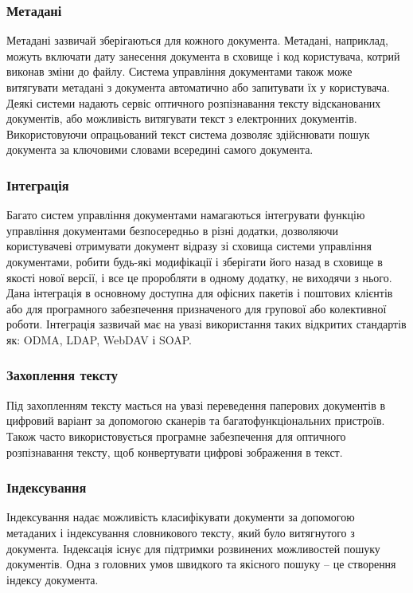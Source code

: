 \subsubsection{Метадані}
Метадані зазвичай зберігаються для кожного документа. 
Метадані, наприклад, можуть включати дату занесення документа в сховище і код користувача, котрий виконав зміни до файлу. 
Система управління документами також може витягувати метадані з документа автоматично або запитувати їх у користувача. 
Деякі системи надають сервіс оптичного розпізнавання тексту відсканованих документів, або можливість витягувати текст з електронних документів. 
Використовуючи опрацьований текст система дозволяє здійснювати пошук документа за ключовими словами всередині самого документа.

\subsubsection{Інтеграція }
Багато систем управління документами намагаються інтегрувати функцію управління документами безпосередньо в різні додатки, дозволяючи користувачеві отримувати документ відразу зі сховища системи управління документами, робити будь-які модифікації і зберігати його назад в сховище в якості нової версії, і все це проробляти в одному додатку, не виходячи з нього. 
Дана інтеграція в основному доступна для офісних пакетів і поштових клієнтів або для програмного забезпечення призначеного для групової або колективної роботи. 
Інтеграція зазвичай має на увазі використання таких відкритих стандартів як: ODMA, LDAP, WebDAV і SOAP.

\subsubsection{Захоплення тексту}
Під захопленням тексту мається на увазі переведення паперових документів в цифровий варіант за допомогою сканерів та багатофункціональних пристроїв.
Також часто використовується програмне забезпечення для оптичного розпізнавання тексту, щоб конвертувати цифрові зображення в текст.

\subsubsection{Індексування}
Індексування надає можливість класифікувати документи за допомогою метаданих і індексування словникового тексту, який було витягнутого з документа.
Індексація існує для підтримки розвинених можливостей пошуку документів. 
Одна з головних умов швидкого та якісного пошуку -- це створення індексу документа.


